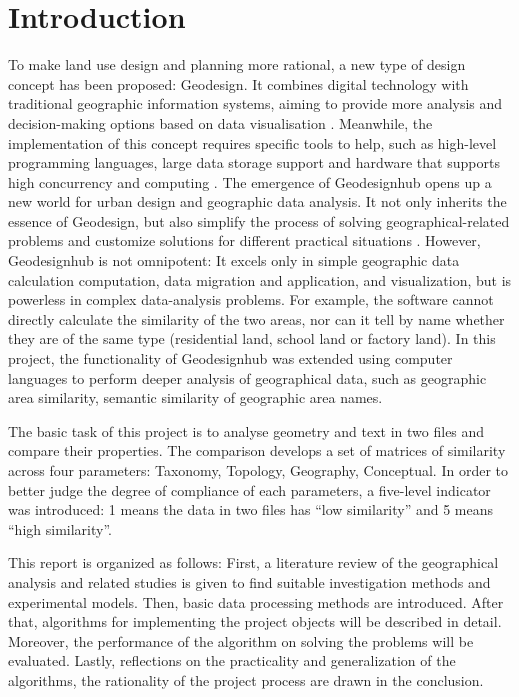 

\setlength{\baselineskip}{20pt}%
\setlength{\parskip}{5pt}


\section*{Introduction}
To make land use design and planning more rational, a new type of design concept has been proposed: Geodesign. It combines digital technology with traditional geographic information systems, aiming to provide more analysis and decision-making options based on data visualisation \cite{bib1}. Meanwhile, the implementation of this concept requires specific tools to help, such as high-level programming languages, large data storage support and hardware that supports high concurrency and computing \cite{bib2}. The emergence of Geodesignhub opens up a new world for urban design and geographic data analysis. It not only inherits the essence of Geodesign, but also simplify the process of solving geographical-related problems and customize solutions for different practical situations \cite{bib3}. However, Geodesignhub is not omnipotent: It excels only in simple geographic data calculation computation, data migration and application, and visualization, but is powerless in complex data-analysis problems. For example, the software cannot directly calculate the similarity of the two areas, nor can it tell by name whether they are of the same type (residential land, school land or factory land). In this project, the functionality of Geodesignhub was extended using computer languages to perform deeper analysis of geographical data, such as geographic area similarity, semantic similarity of geographic area names. 

\marginLeft{}
The basic task of this project is to analyse geometry and text in two files and compare their properties. The comparison develops a set of matrices of similarity across four parameters: Taxonomy, Topology, Geography, Conceptual. In order to better judge the degree of compliance of each parameters, a five-level indicator was introduced: 1 means the data in two files has “low similarity” and 5 means “high similarity”. 


\marginLeft{}
This report is organized as follows: First, a literature review of the geographical analysis and related studies is given to find suitable investigation methods and experimental models. Then, basic data processing methods are introduced. After that, algorithms for implementing the project objects will be described in detail. Moreover, the performance of the algorithm on solving the problems will be evaluated. Lastly, reflections on the practicality and generalization of the algorithms, the rationality of the project process are drawn in the conclusion.  

